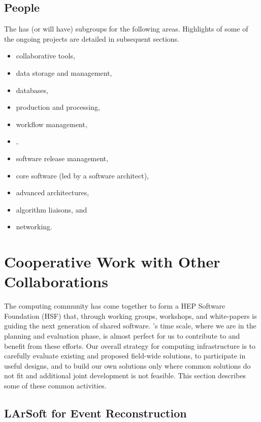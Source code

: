 \subsection{People}

The  has (or will have) subgroups for the following areas.  Highlights of some of the ongoing projects are detailed in subsequent sections. 

\begin{itemize}
    \item collaborative tools,
\item data storage and management,
\item databases,
\item production and processing, 
\item workflow management,
\item {},
\item software release management, 
\item core software (led by a software architect),
\item advanced architectures,
\item algorithm liaisons, and 
\item networking.
\end{itemize}
\section{Cooperative Work with Other Collaborations}
\label{ch:exec-comp-gov-coop}

The  computing community has come together to form a HEP Software Foundation (HSF)\cite{Alves:2017she} that, through working groups, workshops, and white-papers is guiding the next generation of shared  software.  's time scale, where we are in the planning and evaluation phase, is almost perfect for us to contribute to and benefit from these efforts.  Our overall strategy for computing infrastructure is to carefully evaluate existing and proposed field-wide solutions, to participate in useful designs, and to build our own solutions only where common solutions do not fit and additional joint development is not feasible.   This section describes some of these common activities. 



\subsection{LArSoft for Event Reconstruction}

